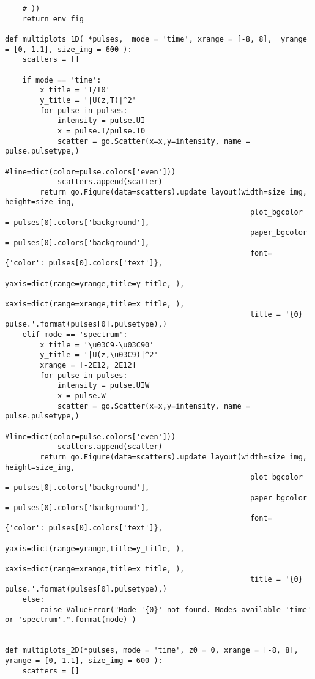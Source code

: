 \begin{verbatim}
    # ))        
    return env_fig

def multiplots_1D( *pulses,  mode = 'time', xrange = [-8, 8],  yrange = [0, 1.1], size_img = 600 ):
    scatters = []
    
    if mode == 'time':
        x_title = 'T/T0'
        y_title = '|U(z,T)|^2'
        for pulse in pulses:
            intensity = pulse.UI
            x = pulse.T/pulse.T0
            scatter = go.Scatter(x=x,y=intensity, name = pulse.pulsetype,)
                                #line=dict(color=pulse.colors['even']))
            scatters.append(scatter)
        return go.Figure(data=scatters).update_layout(width=size_img, height=size_img,
                                                        plot_bgcolor  = pulses[0].colors['background'],
                                                        paper_bgcolor = pulses[0].colors['background'],
                                                        font= {'color': pulses[0].colors['text']},
                                                        yaxis=dict(range=yrange,title=y_title, ), 
                                                        xaxis=dict(range=xrange,title=x_title, ), 
                                                        title = '{0} pulse.'.format(pulses[0].pulsetype),)
    elif mode == 'spectrum':
        x_title = '\u03C9-\u03C90'
        y_title = '|U(z,\u03C9)|^2'
        xrange = [-2E12, 2E12]
        for pulse in pulses:
            intensity = pulse.UIW
            x = pulse.W
            scatter = go.Scatter(x=x,y=intensity, name = pulse.pulsetype,)
                                #line=dict(color=pulse.colors['even']))
            scatters.append(scatter)
        return go.Figure(data=scatters).update_layout(width=size_img, height=size_img,
                                                        plot_bgcolor  = pulses[0].colors['background'],
                                                        paper_bgcolor = pulses[0].colors['background'],
                                                        font= {'color': pulses[0].colors['text']},
                                                        yaxis=dict(range=yrange,title=y_title, ), 
                                                        xaxis=dict(range=xrange,title=x_title, ), 
                                                        title = '{0} pulse.'.format(pulses[0].pulsetype),)
    else:
        raise ValueError("Mode '{0}' not found. Modes available 'time' or 'spectrum'.".format(mode) )


def multiplots_2D(*pulses, mode = 'time', z0 = 0, xrange = [-8, 8],  yrange = [0, 1.1], size_img = 600 ):
    scatters = []
    

\end{verbatim}
